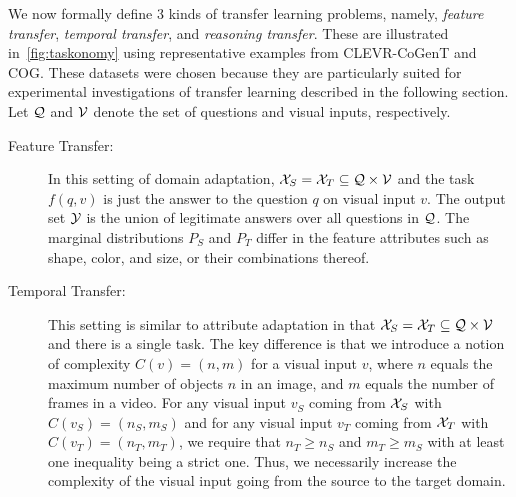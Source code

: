 We now formally define 3 kinds of transfer learning problems, namely,
\emph{feature transfer}, \emph{temporal transfer},
and \emph{reasoning transfer}.
These are illustrated in~\cref{fig:taskonomy} using representative examples from CLEVR-CoGenT and COG. These datasets were chosen because they 
are particularly suited for experimental investigations of transfer learning described in the following section.
Let $\mathcal{Q}$ and $\mathcal{V}$ denote the set of questions and visual inputs, respectively.
\begin{description}
	\item[Feature Transfer:] In this setting of domain adaptation, $\mathcal{X}_S = \mathcal{X}_T \subseteq \mathcal{Q} \times \mathcal{V}$
	and the task $f(q,v)$ is just the answer to the question $q$ on visual input $v$. The output set $\mathcal{Y}$ is the union of legitimate answers
	over all questions in $\mathcal{Q}$.
	The marginal distributions $P_S$ and $P_T$ differ in the feature attributes such as shape, color, and size, or their combinations
	thereof.

	\item[Temporal Transfer:] This setting is similar to attribute adaptation in that $\mathcal{X}_S = \mathcal{X}_T \subseteq \mathcal{Q} \times \mathcal{V}$
	and there is a single task.
	The key difference is that we introduce a notion of complexity $C(v) = (n, m)$ for a visual input $v$,
	where $n$ equals the maximum number of objects $n$ in an image, and $m$
	equals  the number of frames in a video.
	For any visual input $v_S$ coming from $\mathcal{X}_S$ with $C(v_S) = (n_S, m_S)$
	and for any visual input $v_T$ coming from $\mathcal{X}_T$ with $C(v_T) = (n_T, m_T)$, we require that $n_T \ge n_S$ and
	$m_T \ge m_S$ with at least one inequality being a strict one.
	Thus, we necessarily increase the complexity of the visual input going from the source to the target domain.


\end{description}
